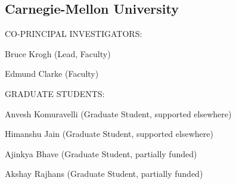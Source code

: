                \subsection{Carnegie-Mellon University}

               \begin{indentation}{0pt}{0pt}{0pt}
                 \uppercase{CO-PRINCIPAL INVESTIGATORS:}
               \end{indentation}

               \begin{indentation}{36pt}{0pt}{0pt}
                 Bruce Krogh (Lead, Faculty)
               \end{indentation}

               \begin{indentation}{36pt}{0pt}{0pt}
                 Edmund Clarke (Faculty)
               \end{indentation}

               \begin{indentation}{0pt}{0pt}{0pt}
               \end{indentation}

               \begin{indentation}{0pt}{0pt}{0pt}
                 \uppercase{GRADUATE STUDENTS:}
               \end{indentation}

               \begin{indentation}{0pt}{0pt}{0pt}

               \end{indentation}

               \begin{indentation}{36pt}{0pt}{0pt}
                 Anvesh Komuravelli (Graduate Student, supported elsewhere)
               \end{indentation}

               \begin{indentation}{36pt}{0pt}{0pt}
                 Himanshu Jain (Graduate Student, supported elsewhere)
               \end{indentation}

               \begin{indentation}{36pt}{0pt}{0pt}
                 Ajinkya Bhave (Graduate Student, partially funded)
               \end{indentation}

               \begin{indentation}{36pt}{0pt}{0pt}
                 Akshay Rajhans (Graduate Student, partially funded)
               \end{indentation}

